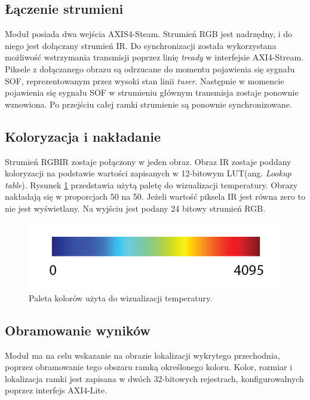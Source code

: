 \subsection{Łączenie strumieni}

Moduł posiada dwa wejścia AXIS4-Steam. Strumień RGB jest nadrzędny, i do niego jest dołączany  strumień IR. %
Do synchronizacji została wykorzystana możliwość wstrzymania transmisji poprzez linię \textit{tready} w interfejsie AXI4-Stream. 
Piksele z dołączanego obrazu są odrzucane do momentu pojawienia się sygnału SOF, reprezentowanym przez wysoki stan linii \textit{tuser}. Następnie w momencie pojawienia się sygnału SOF w strumieniu głównym transmisja zostaje ponownie wznowiona. %
Po przejściu całej ramki strumienie są ponownie synchronizowane.  
\subsection{Koloryzacja i nakładanie}
Strumień RGBIR zostaje połączony w jeden obraz. 
Obraz IR zostaje poddany koloryzacji na podstawie wartości zapisanych w 12-bitowym LUT(ang. \textit{Lookup table}). Rysunek \ref{fig:jetPalet} przedstawia użytą paletę do wizualizacji temperatury. Obrazy nakładają się w proporcjach 50 na 50. Jeżeli wartość piksela IR jest równa zero to nie jest wyświetlany.
Na wyjściu jest podany 24 bitowy strumień RGB.
\begin{figure}
\centering
\includegraphics[width=0.5\linewidth]{images/jetPalet.png}
\caption[Paleta kolorów użyta do wizualizacji temperatury.]{ Paleta kolorów użyta do wizualizacji temperatury.}
\label{fig:jetPalet}
\end{figure}
\subsection{Obramowanie wyników}
Moduł ma na celu wskazanie na obrazie lokalizacji wykrytego przechodnia, poprzez obramowanie tego obszaru ramką określonego koloru. Kolor, rozmiar i lokalizacja ramki jest zapisana w dwóch 32-bitowych rejestrach, konfigurowalnych poprzez interfejs AXI4-Lite. 
